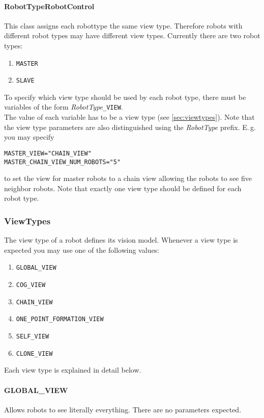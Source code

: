\paragraph{RobotTypeRobotControl}\label{sec:robotTypeRobotControl} This class assigns each robottype the same view type. Therefore robots with different robot types may have different view types. Currently there are two robot types:
\begin{enumerate}
	\item \texttt{MASTER}
	\item \texttt{SLAVE}
\end{enumerate}
To specify which view type should be used by each robot type, there must be variables of the form \textit{RobotType}\texttt{\_VIEW}. \\
The value of each variable has to be a view type (see \ref{sec:viewtypes}). Note that the view type parameters are also distinguished using the \textit{RobotType} prefix. E.\,g. you may specify 
\begin{center}
\texttt{MASTER\_VIEW="CHAIN\_VIEW"} \\
\texttt{MASTER\_CHAIN\_VIEW\_NUM\_ROBOTS="5"}
\end{center} to set the view for master robots to a chain view allowing the robots to see five neighbor robots. Note that exactly one view type should be defined for each robot type.

\subsubsection{ViewTypes}\label{sec:viewtypes}
The view type of a robot defines its vision model. Whenever a view type is expected you may use one of the following values:
\begin{enumerate}
	\item \texttt{GLOBAL\_VIEW}
	\item \texttt{COG\_VIEW}
	\item \texttt{CHAIN\_VIEW}
	\item \texttt{ONE\_POINT\_FORMATION\_VIEW}
	\item \texttt{SELF\_VIEW}
	\item \texttt{CLONE\_VIEW}
\end{enumerate}
Each view type is explained in detail below.

\paragraph{GLOBAL\_VIEW} Allows robots to see literally everything. There are no parameters expected.

